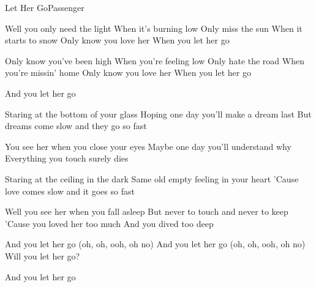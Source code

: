 \documentclass[a4paper,11pt,french]{article}
\begin{document}
\begin{Song}{Let Her Go}{Passenger}
\begin{multicols}{2}
\begin{Chorus}
Well you only need the light 
When it's burning low
Only miss the sun 
When it starts to snow
Only know you love her 
When you let her go
\espaceInterStrophe

Only know you've been high 
When you're feeling low
Only hate the road 
When you’re missin' home
Only know you love her 
When you let her go
\end{Chorus}
\espaceInterStrophe

\begin{Verse}
And you let her go
\espaceInterStrophe

Staring at the bottom of your glass
Hoping one day you'll make a dream last
But dreams come slow and they go so fast
\espaceInterStrophe

You see her when you close your eyes
Maybe one day you'll understand why
Everything you touch surely dies
\end{Verse}
\espaceInterStrophe

\aurefrain
\espaceInterStrophe

\begin{Verse}
Staring at the ceiling in the dark
Same old empty feeling in your heart
'Cause love comes slow and it goes so fast
\espaceInterStrophe

Well you see her when you fall asleep
But never to touch and never to keep
'Cause you loved her too much
And you dived too deep
\end{Verse}
\espaceInterStrophe

\aurefrain
\espaceInterStrophe

\begin{Chorus}
And you let her go (oh, oh, ooh, oh no)
And you let her go (oh, oh, ooh, oh no)
Will you let her go?
\end{Chorus}
\espaceInterStrophe

\aurefrain
\espaceInterStrophe

\aurefrain
\espaceInterStrophe

\begin{Verse}
And you let her go
\end{Verse}

\end{multicols}

\vfill

\begin{multicols}{2}


\end{multicols}
\end{Song}
\end{document}
